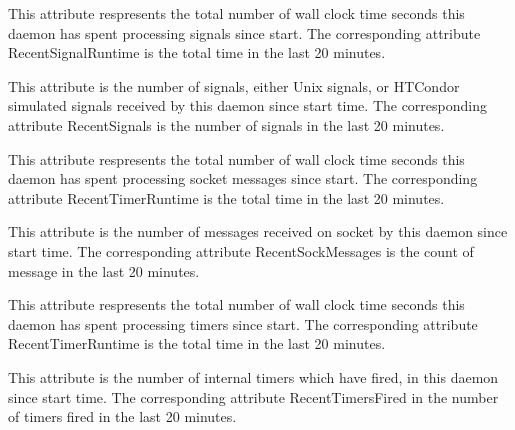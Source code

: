 \begin{description}
\item[\AdAttr{SignalRuntime}:] This attribute respresents the total number of wall clock time seconds this daemon has spent processing signals since start.  The corresponding attribute RecentSignalRuntime is the total time in the last 20 minutes.

\item[\AdAttr{Signals}:] This attribute is the number of signals, either Unix signals, or HTCondor simulated signals received by this daemon since start time.  The corresponding attribute RecentSignals is the number of signals in the last 20 minutes.

\item[\AdAttr{SocketRuntime}:] This attribute respresents the total number of wall clock time seconds this daemon has spent processing socket messages since start.  The corresponding attribute RecentTimerRuntime is the total time in the last 20 minutes.

\item[\AdAttr{SockMessages}:] This attribute is the number of messages received on socket by this daemon since start time.  The corresponding attribute RecentSockMessages is the count of message in the last 20 minutes.

\item[\AdAttr{TimerRuntime}:] This attribute respresents the total number of wall clock time seconds this daemon has spent processing timers since start.  The corresponding attribute RecentTimerRuntime is the total time in the last 20 minutes.

\item[\AdAttr{TimersFired}:] This attribute is the number of internal timers which have fired, in this daemon since start time.  The corresponding attribute RecentTimersFired in the number of timers fired in the last 20 minutes.

\end{description}
